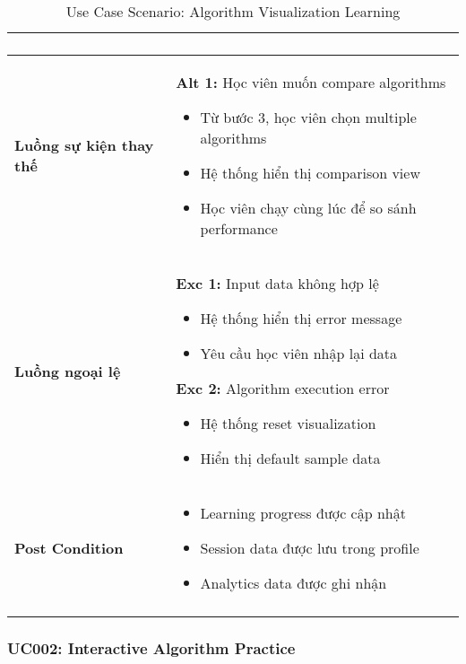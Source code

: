 \begin{longtable}{| p{3cm} | p{10cm} |}
\begin{enumerate}
\end{enumerate} \\ \hline
\textbf{Luồng sự kiện thay thế} & 
\textbf{Alt 1:} Học viên muốn compare algorithms
\begin{itemize}
    \item Từ bước 3, học viên chọn multiple algorithms
    \item Hệ thống hiển thị comparison view
    \item Học viên chạy cùng lúc để so sánh performance
\end{itemize} \\ \hline
\textbf{Luồng ngoại lệ} & 
\textbf{Exc 1:} Input data không hợp lệ
\begin{itemize}
    \item Hệ thống hiển thị error message
    \item Yêu cầu học viên nhập lại data
\end{itemize}
\textbf{Exc 2:} Algorithm execution error
\begin{itemize}
    \item Hệ thống reset visualization
    \item Hiển thị default sample data
\end{itemize} \\ \hline
\textbf{Post Condition} & 
\begin{itemize}
    \item Learning progress được cập nhật
    \item Session data được lưu trong profile
    \item Analytics data được ghi nhận
\end{itemize} \\ \hline
\caption{Use Case Scenario: Algorithm Visualization Learning}
\label{tab:uc001} \\
\end{longtable}

\subsubsection{UC002: Interactive Algorithm Practice}

